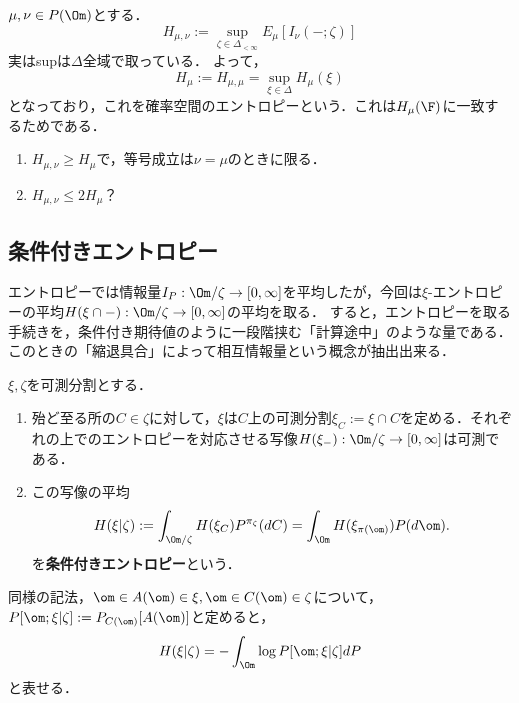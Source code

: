 \documentclass[uplatex,dvipdfmx]{jsreport}
\begin{document}
\begin{definition}
    $\mu,\nu\in P(\Om)$とする．
    \[H_{\mu,\nu}:=\sup_{\zeta\in\Delta_{<\infty}}E_\mu[I_\nu(-;\zeta)]\]
    実はsupは$\Delta$全域で取っている．
    よって，
    \[H_\mu:=H_{\mu,\mu}=\sup_{\xi\in\Delta}H_\mu(\xi)\]
    となっており，これを確率空間のエントロピーという．これは$H_\mu(\F)$に一致するためである．
\end{definition}

\begin{proposition}\mbox{}
    \begin{enumerate}
        \item $H_{\mu,\nu}\ge H_\mu$で，等号成立は$\nu=\mu$のときに限る．
        \item $H_{\mu,\nu}\le 2H_\mu$？
    \end{enumerate}
\end{proposition}

\subsection{条件付きエントロピー}

\begin{tcolorbox}[colframe=ForestGreen, colback=ForestGreen!10!white,breakable,colbacktitle=ForestGreen!40!white,coltitle=black,fonttitle=\bfseries\sffamily,
    title=]
    エントロピーでは情報量$I_P:\Om/\zeta\to[0,\infty]$を平均したが，今回は$\xi$-エントロピーの平均$H(\xi\cap-):\Om/\zeta\to[0,\infty]$の平均を取る．
    すると，エントロピーを取る手続きを，条件付き期待値のように一段階挟む「計算途中」のような量である．
    このときの「縮退具合」によって相互情報量という概念が抽出出来る．
\end{tcolorbox}

\begin{definition}
    $\xi,\zeta$を可測分割とする．
    \begin{enumerate}
        \item 殆ど至る所の$C\in\zeta$に対して，$\xi$は$C$上の可測分割$\xi_C:=\xi\cap C$を定める．それぞれの上でのエントロピーを対応させる写像$H(\xi_-):\Om/\zeta\to[0,\infty]$は可測である．
        \item この写像の平均
        \[H(\xi|\zeta):=\int_{\Om/\zeta}H(\xi_C)P^{\pi_\zeta}(dC)=\int_\Om H(\xi_{\pi(\om)})P(d\om).\]
        を\textbf{条件付きエントロピー}という．
    \end{enumerate}
\end{definition}
\begin{remarks}
    同様の記法，$\om\in A(\om)\in\xi,\om\in C(\om)\in\zeta$について，$P[\om;\xi|\zeta]:=P_{C(\om)}[A(\om)]$と定めると，
    \[H(\xi|\zeta)=-\int_\Om\log P[\om;\xi|\zeta]dP\]
    と表せる．
\end{remarks}
\end{document}
